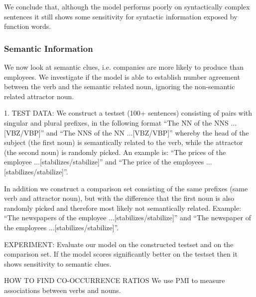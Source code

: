 We conclude that, although the model 
performs poorly on syntactically complex sentences it
still shows some sensitivity for syntactic 
information exposed by function words. 


\subsubsection{Semantic Information}

We now look at semantic clues, i.e. companies
are more likely to produce than employees.
We investigate if the model is able to establish
number agreement between the verb and the semantic related noun,
ignoring the non-semantic related attractor noun.
  
1. TEST DATA:
We construct a testset (100+ sentences) consisting of pairs with singular and plural prefixes, in the following format  
``The NN of the NNS ...[VBZ/VBP]'' and
``The NNS of the NN ...[VBZ/VBP]'' 
whereby the head of the subject (the first noun)
is semantically related to the verb, while the attractor (the second noun)
is randomly picked. An example is:
``The prices of the employee ...[stabilizes/stabilize]'' and 
``The price of the employees ...[stabilizes/stabilize]''.

In addition we construct a comparison set consisting of the same prefixes
(same verb and attractor noun),
but with the difference that the first noun is also randomly picked and
therefore most likely not semantically related. Example:
``The newspapers of the employee ...[stabilizes/stabilize]'' and 
``The newspaper of the employees ...[stabilizes/stabilize]''.


EXPERIMENT:
Evaluate our model on the constructed testset and on the comparison set.
If the model scores significantly better on the testset
then it shows sensitivity to semantic clues.


HOW TO FIND CO-OCCURRENCE RATIOS
We use PMI to measure associations between verbs and nouns.


